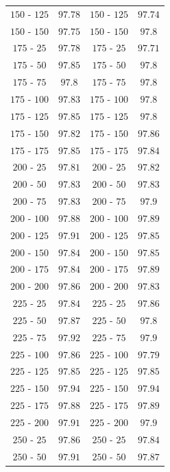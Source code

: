 \documentclass[11pt,a4paper,twoside,
openright]{book}
\begin{document}
\begin{center}
\begin{table}[]
\begin{center}
\begin{tabular}{@{}cc|cc@{}}
$150$ - $125$ & $97.78$  & $150$ - $125$ & $97.74$ \\ [1pt]
$150$ - $150$ & $97.75$  &  $150$ - $150$ & $97.8$ \\ [1pt]
$175$ - $25$ & $97.78$  &  $175$ - $25$ & $97.71$ \\ [1pt]
$175$ - $50$ & $97.85$ &  $175$ - $50$ & $97.8$ \\ [1pt]
$175$ - $75$ & $97.8$ &  $175$ - $75$ & $97.8$ \\ [1pt]
$175$ - $100$ & $97.83$  &  $175$ - $100$ & $97.8$ \\ [1pt]
$175$ - $125$ & $97.85$  &  $175$ - $125$ & $97.8$ \\ [1pt]
$175$ - $150$ & $97.82$  & $175$ - $150$ & $97.86$ \\ [1pt]
$175$ - $175$ & $97.85$  & $175$ - $175$ & $97.84$ \\ [1pt]
$200$ - $25$ & $97.81$  &  $200$ - $25$ & $97.82$ \\ [1pt]
$200$ - $50$ & $97.83$  &  $200$ - $50$ & $97.83$ \\ [1pt]
$200$ - $75$ & $97.83$ &  $200$ - $75$ & $97.9$ \\ [1pt]
$200$ - $100$ & $97.88$  & $200$ - $100$ & $97.89$ \\ [1pt]
$200$ - $125$ & $97.91$  & $200$ - $125$ & $97.85$ \\ [1pt]
$200$ - $150$ & $97.84$  & $200$ - $150$ & $97.85$ \\ [1pt]
$200$ - $175$ & $97.84$  & $200$ - $175$ & $97.89$ \\ [1pt]
$200$ - $200$ & $97.86$  & $200$ - $200$ & $97.83$ \\ [1pt]
$225$ - $25$ & $97.84$ & $225$ - $25$ & $97.86$ \\ [1pt]
$225$ - $50$ & $97.87$ &  $225$ - $50$ & $97.8$ \\ [1pt]
$225$ - $75$ & $97.92$ &  $225$ - $75$ & $97.9$ \\ [1pt]
$225$ - $100$ & $97.86$  & $225$ - $100$ & $97.79$ \\ [1pt]
$225$ - $125$ & $97.85$  & $225$ - $125$ & $97.85$ \\ [1pt]
$225$ - $150$ & $97.94$  & $225$ - $150$ & $97.94$ \\ [1pt]
$225$ - $175$ & $97.88$  & $225$ - $175$ & $97.89$ \\ [1pt]
$225$ - $200$ & $97.91$  &  $225$ - $200$ & $97.9$ \\ [1pt]
$250$ - $25$ & $97.86$  &  $250$ - $25$ & $97.84$ \\ [1pt]
$250$ - $50$ & $97.91$  &  $250$ - $50$ & $97.87$ \\ [1pt]

\end{tabular}
\end{center}
\end{table}
\end{center}
\end{document}
